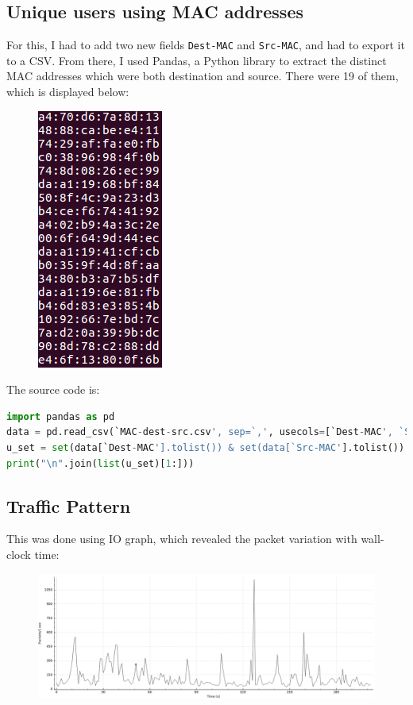 \documentclass{article}
\begin{document}
\subsection{Unique users using MAC addresses}
\begin{flushleft}
For this, I had to add two new fields \texttt{Dest-MAC} and \texttt{Src-MAC}, and had to export it to a CSV. From there, I used Pandas, a Python library to extract the distinct MAC addresses which were both destination and source. There were 19 of them, which is displayed below:
\begin{figure}[H]
\centering
\includegraphics[width=0.25\linewidth]{users-mac.png}
\end{figure}
The source code is:
\begin{lstlisting}[basicstyle=\footnotesize\ttfamily, showstringspaces=false, language=Python]
import pandas as pd
data = pd.read_csv(`MAC-dest-src.csv', sep=`,', usecols=[`Dest-MAC', `Src-MAC'])
u_set = set(data[`Dest-MAC'].tolist()) & set(data[`Src-MAC'].tolist())
print("\n".join(list(u_set)[1:]))
\end{lstlisting}
\end{flushleft}

\subsection{Traffic Pattern}
\begin{flushleft}
This was done using IO graph, which revealed the packet variation with wall-clock time:
\begin{figure}[H]
\centering
\includegraphics[width=0.75\linewidth]{traffic-pattern-l2.png}
\end{figure}
\end{flushleft}
\end{document}
